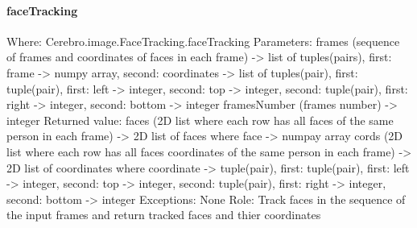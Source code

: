\paragraph{faceTracking}
Where: Cerebro.image.FaceTracking.faceTracking \newline
Parameters: frames (sequence of frames and coordinates of faces in each frame) -> \newline
list of tuples(pairs), first: frame -> numpy array, second: coordinates -> \newline
list of tuples(pair), first: tuple(pair), first: left -> integer, second: top -> integer, second: tuple(pair), first: right -> integer, second: bottom -> integer \newline
framesNumber (frames number) -> integer \newline
Returned value: \newline
faces (2D list where each row has all faces of the same person in each frame) -> 2D list of faces where face -> numpay array \newline
cords (2D list where each row has all faces coordinates of the same person in each frame) -> 2D list of coordinates where coordinate -> \newline
tuple(pair), first: tuple(pair), first: left -> integer, second: top -> integer, second: tuple(pair), first: right -> integer, second: bottom -> integer \newline
Exceptions: None \newline
Role: Track faces in the sequence of the input frames and return tracked faces and thier coordinates 